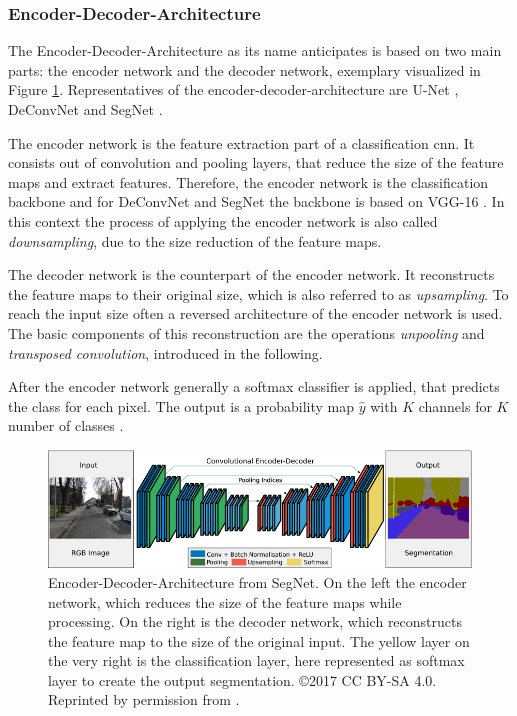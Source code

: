 \subsubsection{Encoder-Decoder-Architecture}
The Encoder-Decoder-Architecture as its name anticipates is based on two main parts: the encoder network and the decoder network, exemplary visualized in Figure \ref{fig:ch2:sec2:encoder-decoder}. 
Representatives of the encoder-decoder-architecture are U-Net \cite{RF15-U-Net}, DeConvNet \cite{NHH15-DeConvNet} and SegNet \cite{Bad17-SegNet}.

The encoder network is the feature extraction part of a classification \gls{cnn}.
It consists out of convolution and pooling layers, that reduce the size of the feature maps and extract features.
Therefore, the encoder network is the classification backbone and for DeConvNet \cite{NHH15-DeConvNet} and SegNet \cite{Bad17-SegNet} the backbone is based on VGG-16 \cite{SZ15-VGG16}. 
In this context the process of applying the encoder network is also called \textit{downsampling}, due to the size reduction of the feature maps.

The decoder network is the counterpart of the encoder network.
It reconstructs the feature maps to their original size, which is also referred to as \textit{upsampling}.
To reach the input size often a reversed architecture of the encoder network is used.
The basic components of this reconstruction are the operations \textit{unpooling} and \textit{transposed convolution}, introduced in the following.

After the encoder network generally a softmax classifier is applied, that predicts the class for each pixel.
The output is a probability map $\hat{y}$ with $K$ channels for $K$ number of classes \cite{Bad17-SegNet}.

\begin{figure} [!b]
	\includegraphics[width=\linewidth]{figures/chap223_segnet_arch.png}
	\caption[Encoder-Decoder-Architecture]{
		Encoder-Decoder-Architecture from SegNet. 
		On the left the encoder network, which reduces the size of the feature maps while processing. 
		On the right is the decoder network, which reconstructs the feature map to the size of the original input. 
		The yellow layer on the very right is the classification layer, here represented as softmax layer to create the output segmentation. 
		\copyright 2017 CC BY-SA 4.0. Reprinted by permission from \cite{Bad17-SegNet}.}
	\label{fig:ch2:sec2:encoder-decoder}
\end{figure}

